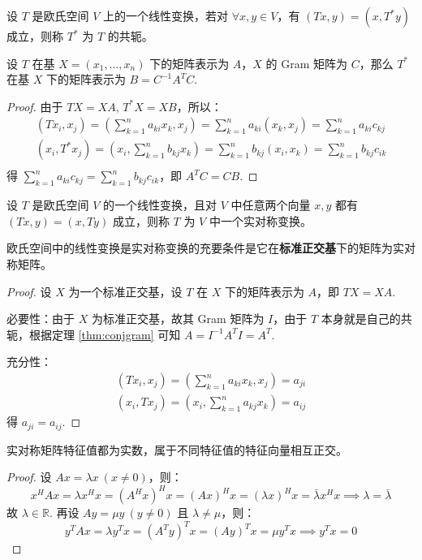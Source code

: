 \begin{definition}[线性变换的共轭]
设 $T$ 是欧氏空间 $V$ 上的一个线性变换，若对 $\forall x,y\in V$，有 $(Tx,y)=(x,T^\ast y)$ 成立，则称 $T^\ast$ 为 $T$ 的共轭。
\end{definition}

\begin{theorem}
\label{thm:conjgram}
设 $T$ 在基 $X=(x_1,\ldots,x_n)$ 下的矩阵表示为 $A$，$X$ 的 Gram 矩阵为 $C$，那么 $T^\ast$ 在基 $X$ 下的矩阵表示为 $B=C^{-1}A^TC$.
\end{theorem}
\begin{proof}
由于 $TX=XA,\,T^\ast X=XB$，所以：
\begin{gather*}
    (Tx_i,x_j)=\left(\sum_{k=1}^na_{ki}x_k,x_j\right)=\sum_{k=1}^na_{ki}(x_k,x_j)=\sum_{k=1}^na_{ki}c_{kj}\\
    (x_i,T^\ast x_j)=\left(x_i,\sum_{k=1}^nb_{kj}x_k\right)=\sum_{k=1}^nb_{kj}(x_i,x_k)=\sum_{k=1}^nb_{kj}c_{ik}\\
\end{gather*}
得 $\sum_{k=1}^na_{ki}c_{kj}=\sum_{k=1}^n b_{kj}c_{ik}$，即 $A^TC=CB$.
\end{proof}

\begin{definition}[实对称变换]
设 $T$ 是欧氏空间 $V$ 的一个线性变换，且对 $V$ 中任意两个向量 $x,y$ 都有 $(Tx,y)=(x,Ty)$ 成立，则称 $T$ 为 $V$ 中一个实对称变换。
\end{definition}

\begin{theorem}[实对称变换与实对称矩阵]
欧氏空间中的线性变换是实对称变换的充要条件是它在\textbf{标准正交基}下的矩阵为实对称矩阵。
\end{theorem}
\begin{proof}
设 $X$ 为一个标准正交基，设 $T$ 在 $X$ 下的矩阵表示为 $A$，即 $TX=XA$.

必要性：由于 $X$ 为标准正交基，故其 Gram 矩阵为 $I$，由于 $T$ 本身就是自己的共轭，根据定理 \ref{thm:conjgram} 可知 $A=I^{-1}A^TI=A^T$.

充分性：
\begin{gather*}
(Tx_i,x_j)=\left(\sum_{k=1}^na_{ki}x_k,x_j\right)=a_{ji}\\
(x_i,Tx_j)=\left(x_i,\sum_{k=1}^na_{kj}x_k\right)=a_{ij}
\end{gather*}
得 $a_{ji}=a_{ij}$.
\end{proof}

\begin{theorem}
实对称矩阵特征值都为实数，属于不同特征值的特征向量相互正交。
\end{theorem}
\begin{proof}
设 $Ax=\lambda x\ (x\neq 0)$，则：
\[
x^HAx=\lambda x^Hx=(A^Hx)^Hx=(Ax)^Hx=(\lambda x)^Hx=\bar\lambda x^Hx\implies \lambda=\bar\lambda
\]
故 $\lambda\in\mathbb R$.
再设 $Ay=\mu y\ (y\neq 0)$ 且 $\lambda\neq \mu$，则：
\[
y^TAx=\lambda y^Tx=(A^Ty)^Tx=(Ay)^Tx=\mu y^Tx\implies y^Tx=0
\]
\end{proof}

